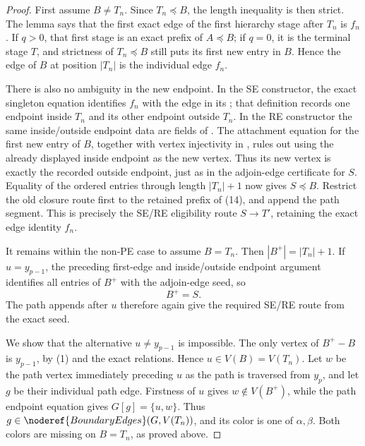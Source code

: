 \begin{proof}
First assume \(B\ne T_n\).  Since \(T_n\preccurlyeq B\), the length
inequality is then strict.  The lemma
 says that the first exact edge of
the first hierarchy stage after \(T_n\) is \(f_n\).  If \(q>0\), that
first stage is an exact prefix of \(A\preccurlyeq B\); if \(q=0\), it is
the terminal stage \(T\), and strictness of \(T_n\preccurlyeq B\) still
puts its first new entry in \(B\).  Hence the edge of \(B\) at position
\(|T_n|\) is the individual edge \(f_n\).

There is also no ambiguity in the new endpoint.  In the SE constructor,
the exact singleton equation identifies \(f_n\) with the edge in its
; that definition records one endpoint
inside \(T_n\) and its other endpoint outside \(T_n\).  In the RE
constructor the same inside/outside endpoint data are fields of
.  The attachment equation for
the first new entry of \(B\), together with vertex injectivity in
, rules out using the already displayed inside
endpoint as the new vertex.  Thus its new vertex is exactly the recorded
outside endpoint, just as in the adjoin-edge certificate for \(S\).
Equality of the ordered entries through length \(|T_n|+1\) now gives
\(S\preccurlyeq B\).  Restrict the old closure route first to the retained
prefix of (14), and append the path segment.  This is precisely the
SE/RE eligibility route \(S\longrightarrow T'\), retaining the exact edge
identity \(f_n\).

It remains within the non-PE case to assume \(B=T_n\).  Then
\(|B^+|=|T_n|+1\).  If \(u=y_{p-1}\), the preceding first-edge and
inside/outside endpoint argument identifies all entries of \(B^+\) with
the adjoin-edge seed, so
\[
                              B^+=S.                            \tag{14c}
\]
The path appends after \(u\) therefore again give the required SE/RE
route from the exact seed.

We show that the alternative \(u\ne y_{p-1}\) is impossible.  The only
vertex of \(B^+-B\) is \(y_{p-1}\), by (1) and the exact
 relations.  Hence \(u\in V(B)=V(T_n)\).
Let \(w\) be the path vertex immediately preceding \(u\) as the path is
traversed from \(y_p\), and let \(g\) be their individual path edge.
Firstness of \(u\) gives \(w\notin V(B^+)\), while the path endpoint
equation gives \(G[g]=\{u,w\}\).  Thus
\(g\in\noderef{BoundaryEdges}(G,V(T_n))\), and its color is one of
\(\alpha,\beta\).  Both colors are missing on \(B=T_n\), as proved above.


\end{proof}
